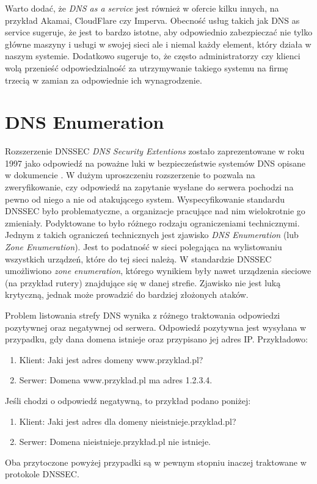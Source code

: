 Warto dodać, że \textit{DNS as a service} jest również w ofercie kilku innych, na przykład Akamai\cite{akamai}, CloudFlare\cite{cloudflare} czy Imperva\cite{incapsula}. Obecność usług takich jak DNS as service sugeruje, że jest to bardzo istotne, aby odpowiednio zabezpieczać nie tylko główne maszyny i usługi w swojej sieci ale i niemal każdy element, który działa w naszym systemie. Dodatkowo sugeruje to, że często administratorzy czy klienci wolą przenieść odpowiedzialność za utrzymywanie takiego systemu na firmę trzecią w zamian za odpowiednie ich wynagrodzenie.

\section{DNS Enumeration}
Rozszerzenie DNSSEC \textit{DNS Security Extentions} zostało zaprezentowane w roku 1997\cite{RFC2065} jako odpowiedź na poważne luki w bezpieczeństwie systemów DNS opisane w dokumencie \cite{DNSsecurityProblem}. W dużym uproszczeniu rozszerzenie to pozwala na zweryfikowanie, czy odpowiedź na zapytanie wysłane do serwera pochodzi na pewno od niego a nie od atakującego system. Wyspecyfikowanie standardu DNSSEC było problematyczne, a organizacje pracujące nad nim wielokrotnie go zmieniały. Podyktowane to było różnego rodzaju ograniczeniami technicznymi. Jednym z takich ograniczeń technicznych jest zjawisko \textit{DNS Enumeration} (lub \textit{Zone Enumeration}). Jest to podatność w sieci polegająca na wylistowaniu wszystkich urządzeń, które do tej sieci należą. W standardzie DNSSEC umożliwiono \textit{zone enumeration}, którego wynikiem były nawet urządzenia sieciowe (na przykład rutery) znajdujące się w danej strefie. Zjawisko nie jest luką krytyczną, jednak może prowadzić do bardziej złożonych ataków. 

Problem listowania strefy DNS wynika z różnego traktowania odpowiedzi pozytywnej oraz negatywnej od serwera. Odpowiedź pozytywna jest wysyłana w przypadku, gdy dana domena istnieje oraz przypisano jej adres IP. Przykładowo:
\begin{enumerate}
	\item Klient: Jaki jest adres domeny www.przyklad.pl?
	\item Serwer: Domena www.przyklad.pl ma adres 1.2.3.4.
\end{enumerate} 
Jeśli chodzi o odpowiedź negatywną, to przykład podano poniżej:
\begin{enumerate}
	\item Klient: Jaki jest adres dla domeny nieistnieje.przyklad.pl?
	\item Serwer: Domena nieistnieje.przykład.pl nie istnieje.
\end{enumerate}

Oba przytoczone powyżej przypadki są w pewnym stopniu inaczej traktowane w protokole DNSSEC.